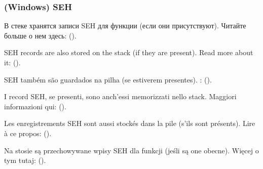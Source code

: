 \subsubsection{(Windows) SEH}

\ifdefined\RUSSIAN
В стеке хранятся записи \ac{SEH} для функции (если они присутствуют).
Читайте больше о нем здесь: ().
\fi %

\ifdefined\ENGLISH
\ac{SEH} records are also stored on the stack (if they are present).
Read more about it: ().
\fi %

\ifdefined\BRAZILIAN
\ac{SEH} também são guardados na pilha (se estiverem presentes).
\PTBRph{}: ().
\fi %

\ifdefined\ITALIAN
I record \ac{SEH}, se presenti, sono anch'essi memorizzati nello stack.
Maggiori informazioni qui: ().
\fi %

\ifdefined\FRENCH
Les enregistrements \ac{SEH} sont aussi stockés dans la pile (s'ils sont présents).
Lire à ce propos: ().
\fi %


\ifdefined\POLISH
Na stosie są przechowywane wpisy \ac{SEH} dla funkcji (jeśli są one obecne).
Więcej o tym tutaj: ().
\fi %